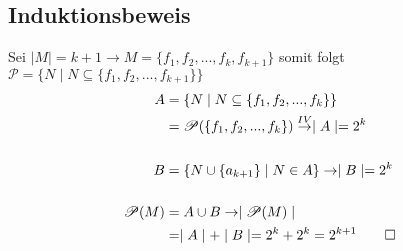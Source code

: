 \documentclass[titlepage]{article}
\begin{document}
			\subsection*{Induktionsbeweis}
				Sei $\mid M\mid=k+1\rightarrow M=\{f_1,f_2,...,f_k,f_{k+1}\}$ somit folgt $\mathscr{P}=\{N\mid N\subseteq\{f_1,f_2,...,f_{k+1}\}\}$\\
				\begin{align*}
					A&=\{N\mid N\subseteq\{f_1,f_2,...,f_k\}\}\\
					&=\mathscr{P}(\{f_1,f_2,...,f_k\})\overset{IV}{\rightarrow}\mid A\mid=2^k\\\\
					B&=\{N\cup\{a_{k+1}\}\mid N\in A\}\rightarrow\mid B\mid=2^k\\\\
					\mathscr{P}(M)&=A\cup B\rightarrow\mid\mathscr{P}(M)\mid\\
					&=\mid A\mid+\mid B\mid=2^k+2^k=2^{k+1}\qed
				\end{align*}
				
\end{document}

